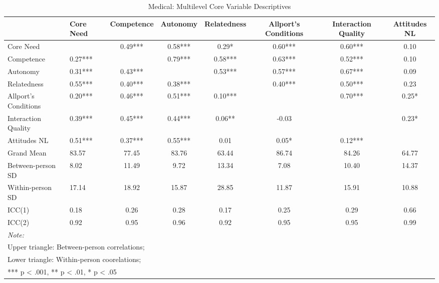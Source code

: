 \begin{table}
\begin{minipage}[t][\textheight][t]{\textwidth}

\caption{Medical: Multilevel Core Variable Descriptives}
\centering
\begin{tabular}[t]{llcccccc}
\toprule
  & Core Need & Competence & Autonomy & Relatedness & Allport's Conditions & Interaction Quality & Attitudes NL\\
\midrule
Core Need &  & 0.49*** & 0.58*** & 0.29* & 0.60*** & 0.60*** & 0.10\\
Competence & 0.27*** &  & 0.79*** & 0.58*** & 0.63*** & 0.52*** & 0.10\\
Autonomy & 0.31*** & 0.43*** &  & 0.53*** & 0.57*** & 0.67*** & 0.09\\
Relatedness & 0.55*** & 0.40*** & 0.38*** &  & 0.40*** & 0.50*** & 0.23\\
Allport's Conditions & 0.20*** & 0.46*** & 0.51*** & 0.10*** &  & 0.70*** & 0.25*\\
\addlinespace
Interaction Quality & 0.39*** & 0.45*** & 0.44*** & 0.06** & -0.03 &  & 0.23*\\
Attitudes NL & 0.51*** & 0.37*** & 0.55*** & 0.01 & 0.05* & 0.12*** & \\
Grand Mean & 83.57 & 77.45 & 83.76 & 63.44 & 86.74 & 84.26 & 64.77\\
Between-person SD & 8.02 & 11.49 & 9.72 & 13.34 & 7.08 & 10.40 & 14.37\\
Within-person SD & 17.14 & 18.92 & 15.87 & 28.85 & 11.87 & 15.91 & 10.88\\
\addlinespace
ICC(1) & 0.18 & 0.26 & 0.28 & 0.17 & 0.25 & 0.29 & 0.66\\
ICC(2) & 0.92 & 0.95 & 0.96 & 0.92 & 0.95 & 0.95 & 0.99\\
\bottomrule
\multicolumn{8}{l}{\rule{0pt}{1em}\textit{Note: }}\\
\multicolumn{8}{l}{\rule{0pt}{1em}Upper triangle: Between-person correlations;}\\
\multicolumn{8}{l}{\rule{0pt}{1em}Lower triangle: Within-person coorelations;}\\
\multicolumn{8}{l}{\rule{0pt}{1em}*** p < .001, ** p < .01,  * p < .05}\\
\end{tabular}
\end{minipage}
\end{table}
